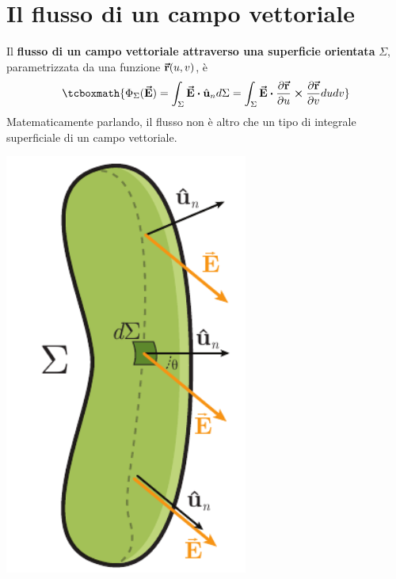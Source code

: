 \section{Il flusso di un campo vettoriale}
\begin{define}
\begin{minipage}{0.8\textwidth}
Il \textbf{flusso di un campo vettoriale attraverso una superficie orientata} $\Sigma$, parametrizzata da una funzione $\vb*{\va{r}}(u,v)$, è
\begin{equation}
	\tcboxmath{\Phi_{\Sigma}(\vba{E})=\int_{\Sigma}\vba{E}\vdot\vbh{u}_nd\Sigma=\int_{\Sigma}\vba{E}\vdot\frac{\partial \vba{r}}{\partial u}\cross\frac{\partial \vba{r}}{\partial v}dudv}
\end{equation}
Matematicamente parlando, il flusso non è altro che un tipo di integrale superficiale di un campo vettoriale.%
\end{minipage}\hspace{10pt}
\begin{minipage}{0.19\textwidth}
	\begin{center}
			\includegraphics[width=0.6\textwidth]{images/chp2flusso.pdf}
	\end{center}
\end{minipage}
\end{define}
